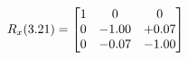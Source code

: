 \documentclass[preview]{standalone}
\begin{document}
\begin{align*}
\special{dvisvgm:raw <g id='unique000'>}R_{x}(3.21) = \begin{bmatrix}1 & 0 & 0 \\0 & -1.00 & +0.07 \\0 & -0.07 & -1.00\end{bmatrix}\special{dvisvgm:raw </g>}
\end{align*}
\end{document}
